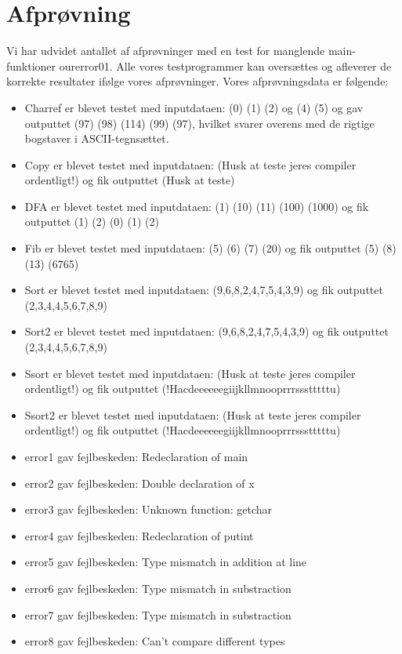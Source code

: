 \documentclass[10pt,a4paper,danish]{article}
\begin{document}
\section{Afprøvning}
Vi har udvidet antallet af afprøvninger med en test for manglende main-funktioner ourerror01. Alle vores testprogrammer kan oversættes og afleverer de korrekte resultater ifølge vores afprøvninger. Vores afprøvningsdata er følgende:\\
\begin{itemize}
\item Charref er blevet testet med inputdataen: (0) (1) (2) og (4) (5) og gav outputtet (97) (98) (114) (99) (97), hvilket svarer overens med de rigtige bogstaver i ASCII-tegnsættet.
\item Copy er blevet testet med inputdataen: (Husk at teste jeres compiler ordentligt!) og fik outputtet (Husk at teste)
\item DFA er blevet testet med inputdataen: (1) (10) (11) (100) (1000) og fik outputtet (1) (2) (0) (1) (2)
\item Fib er blevet testet med inputdataen: (5) (6) (7) (20) og fik outputtet (5) (8) (13) (6765)
\item Sort er blevet testet med inputdataen: (9,6,8,2,4,7,5,4,3,9) og fik outputtet (2,3,4,4,5,6,7,8,9)
\item Sort2 er blevet testet med inputdataen: (9,6,8,2,4,7,5,4,3,9) og fik outputtet (2,3,4,4,5,6,7,8,9)
\item Ssort er blevet testet med inputdataen: (Husk at teste jeres compiler ordentligt!) og fik outputtet (!Hacdeeeeeegiijkllmnooprrrssstttttu)
\item Ssort2 er blevet testet med inputdataen: (Husk at teste jeres compiler ordentligt!) og fik outputtet (!Hacdeeeeeegiijkllmnooprrrssstttttu)
\item error1 gav fejlbeskeden: Redeclaration of main
\item error2 gav fejlbeskeden: Double declaration of x
\item error3 gav fejlbeskeden: Unknown function: getchar
\item error4 gav fejlbeskeden: Redeclaration of putint
\item error5 gav fejlbeskeden: Type mismatch in addition at line
\item error6 gav fejlbeskeden: Type mismatch in substraction
\item error7 gav fejlbeskeden: Type mismatch in substraction
\item error8 gav fejlbeskeden: Can't compare different types

\end{itemize}
\end{document}
